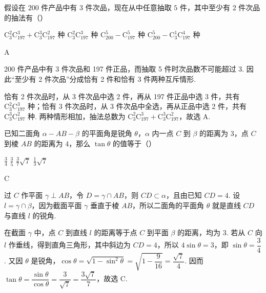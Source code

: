 \begin{problem}
假设在 \(200\) 件产品中有 \(3\) 件次品，现在从中任意抽取 \(5\) 件，其中至少有 \(2\) 件次品的抽法有（\quad）

\choices
    {\(\mathrm C_3^2\mathrm C_{197}^3 + \mathrm C_3^3\mathrm C_{197}^2\) 种}
    {\(\mathrm C_3^2\mathrm C_{197}^3\) 种}
    {\(\mathrm C_{200}^5 - \mathrm C_{197}^5\) 种}
    {\(\mathrm C_{200}^5 - \mathrm C_3^1\mathrm C_{197}^4\) 种}
\end{problem}

\begin{answer}
A
\end{answer}

\begin{solution}
200 件产品中有 3 件次品和 197 件正品，而抽取 5 件时次品数不可能超过 3. 因此“至少有 2 件次品”分成恰有 2 件和恰有 3 件两种互斥情形.

恰有 2 件次品时，从 3 件次品中选 2 件，再从 197 件正品中选 3 件，共有 \(\mathrm C_3^2\mathrm C_{197}^3\) 种；恰有 3 件次品时，从 3 件次品中全选，再从正品中选 2 件，共有 \(\mathrm C_3^3\mathrm C_{197}^2\) 种. 两种情形相加，抽法总数为
\(\mathrm C_3^2\mathrm C_{197}^3+\mathrm C_3^3\mathrm C_{197}^2\)，故选 A.
\end{solution}

\begin{problem}
已知二面角 \(\alpha-AB-\beta\) 的平面角是锐角 \(\theta\)，\(\alpha\) 内一点 \(C\) 到 \(\beta\) 的距离为 \(3\)，点 \(C\) 到棱 \(AB\) 的距离为 \(4\)，那么 \(\tan\theta\) 的值等于（\quad）

\choices
    {\(\frac{3}{4}\)}
    {\(\frac{3}{5}\)}
    {\(\frac{3}{7}\sqrt{7}\)}
    {\(\frac{1}{3}\sqrt{7}\)}
\end{problem}

\begin{answer}
C
\end{answer}

\begin{solution}
过 \(C\) 作平面 \(\gamma\perp AB\)，令 \(D=\gamma\cap AB\)，则 \(CD\subset\alpha\)，且由已知 \(CD=4\). 设 \(l=\gamma\cap\beta\)，因为截面平面 \(\gamma\) 垂直于棱 \(AB\)，所以二面角的平面角 \(\theta\) 就是直线 \(CD\) 与直线 \(l\) 的锐角.

在截面 \(\gamma\) 中，点 \(C\) 到直线 \(l\) 的距离等于点 \(C\) 到平面 \(\beta\) 的距离，均为 \(3\). 若从 \(C\) 向 \(l\) 作垂线，得到直角三角形，其中斜边为 \(CD=4\)，所以
\(4\sin\theta=3\)，即 \(\sin\theta=\dfrac34\). 又因 \(\theta\) 是锐角，\(\cos\theta=\sqrt{1-\sin^2\theta}=\sqrt{1-\dfrac9{16}}=\dfrac{\sqrt7}{4}\). 因而
\(\tan\theta=\dfrac{\sin\theta}{\cos\theta}=\dfrac{3}{\sqrt7}=\dfrac{3\sqrt7}{7}\)，故选 C.
\end{solution}

